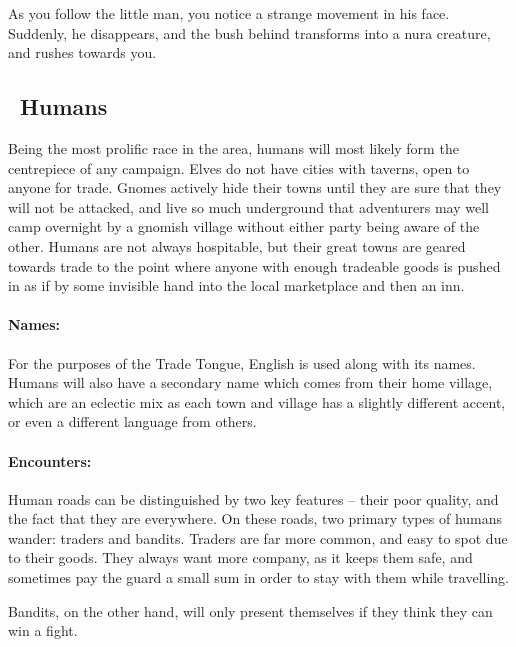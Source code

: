 \begin{multicols}{2}
\begin{boxtext}

  As you follow the little man, you notice a strange movement in his face.
  Suddenly, he disappears, and the bush behind transforms into a nura creature, and rushes towards you.

\end{boxtext}

\subsection[Humans]{\Hu\ Humans}

Being the most prolific race in the area, humans will most likely form the centrepiece of any campaign.  Elves do not have cities with taverns, open to anyone for trade.  Gnomes actively hide their towns until they are sure that they will not be attacked, and live so much underground that adventurers may well camp overnight by a gnomish village without either party being aware of the other.  Humans are not always hospitable, but their great towns are geared towards trade to the point where anyone with enough tradeable goods is pushed in as if by some invisible hand into the local marketplace and then an inn.

\paragraph{Names:} For the purposes of the Trade Tongue, English is used along with its names.
Humans will also have a secondary name which comes from their home village, which are an eclectic mix as each town and village has a slightly different accent, or even a different language from others.

\paragraph{Encounters:} Human roads can be distinguished by two key features -- their poor quality, and the fact that they are everywhere.
On these roads, two primary types of humans wander: traders and bandits.
Traders are far more common, and easy to spot due to their goods.
They always want more company, as it keeps them safe, and sometimes pay the \gls{guard} a small sum in order to stay with them while travelling.

Bandits, on the other hand, will only present themselves if they think they can win a fight.

\label{human_trader}


\end{multicols}
